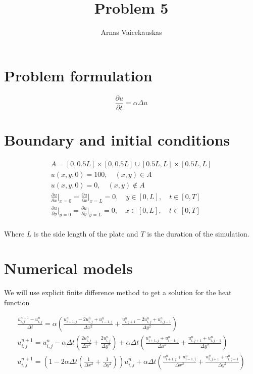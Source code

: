 \documentclass{article}
\title{Problem 5}
\author{Arnas Vaicekauskas}
\begin{document}
\maketitle

\section{Problem formulation}

$$
\frac{\partial u}{\partial t}=\alpha\Delta u
$$

\section{Boundary and initial conditions}

\begin{equation}
    \begin{aligned}
        A = [0,0.5L]\times[0,0.5L]\cup[0.5L,L]\times[0.5L,L]\\
        u(x, y, 0) = 100,\quad (x, y)\in A\\
        u(x, y, 0) = 0,\quad (x, y)\notin A\\
        \frac{\partial u}{\partial x}\Big|_{x=0}=\frac{\partial u}{\partial x}\Big|_{x=L}=0,\quad y\in[0,L],\quad t\in[0,T]\\
        \frac{\partial u}{\partial y}\Big|_{y=0}=\frac{\partial u}{\partial y}\Big|_{y=L}=0,\quad x\in[0,L],\quad t\in[0,T]\\
    \end{aligned}
\end{equation}

Where $L$ is the side length of the plate and $T$ is the duration of the simulation.

\section{Numerical models}

We will use explicit finite difference method to get a solution for the heat function

\begin{equation}
    \begin{aligned}
        \frac{u^{n+1}_{i,j}-u^{n}_{i,j}}{\Delta t}=\alpha\left(\frac{u^n_{i+1,j}-2u^n_{i,j}+u^n_{i-1,j}}{\Delta x^2}+\frac{u^n_{i,j+1}-2u^n_{i,j}+u^n_{i,j-1}}{\Delta y^2}\right)\\
        u^{n+1}_{i,j}=u^{n}_{i,j}-\alpha\Delta t\left(\frac{2u^n_{i,j}}{\Delta x^2}+\frac{2u^n_{i,j}}{\Delta y^2}\right)+\alpha\Delta t\left(\frac{u^n_{i+1,j}+u^n_{i-1,j}}{\Delta x^2}+\frac{u^n_{i,j+1}+u^n_{i,j-1}}{\Delta y^2}\right)\\
        u^{n+1}_{i,j}=\left(1-2\alpha\Delta t\left(\frac{1}{\Delta x^2}+\frac{1}{\Delta y^2}\right)\right)u^{n}_{i,j}+\alpha\Delta t\left(\frac{u^n_{i+1,j}+u^n_{i-1,j}}{\Delta x^2}+\frac{u^n_{i,j+1}+u^n_{i,j-1}}{\Delta y^2}\right)
    \end{aligned}
\end{equation}
\end{document}
